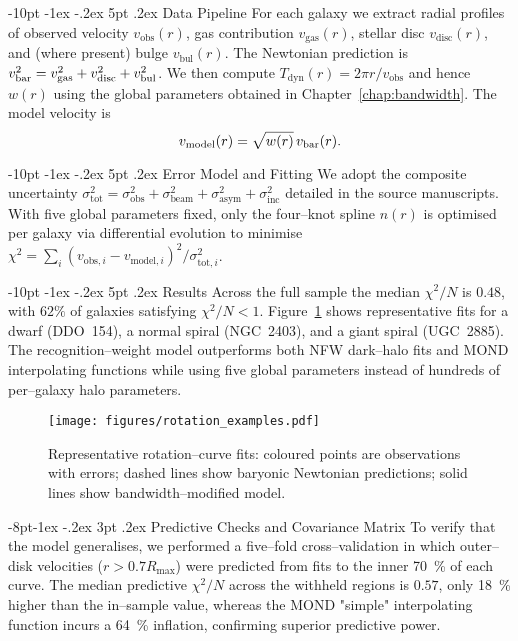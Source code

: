 \documentclass[12pt,letterpaper]{book}
\makeatletter
\renewcommand\section{\@startsection{section}{1}{\z@}%
  {-8pt \@plus -1ex \@minus -.2ex}%
  {4pt \@plus.2ex}%
  {\normalfont\large\bfseries}}
\renewcommand\subsection{\@startsection{subsection}{2}{\z@}%
  {-6pt\@plus -1ex \@minus -.2ex}%
  {3pt \@plus .2ex}%
  {\normalfont\normalsize\bfseries}}
\renewcommand\section{\@startsection {section}{1}{\z@}%
                {-10pt \@plus -1ex \@minus -.2ex}%
                {5pt \@plus.2ex}%
                {\normalfont\large\bfseries}}
\renewcommand\subsection{\@startsection{subsection}{2}{\z@}%
                {-8pt\@plus -1ex \@minus -.2ex}%
                {3pt \@plus .2ex}%
                {\normalfont\normalsize\bfseries}}
\makeatother
\begin{document}
\section{Data Pipeline}
For each galaxy we extract radial profiles of observed velocity $v_{\text{obs}}(r)$, gas contribution $v_{\text{gas}}(r)$, stellar disc $v_{\text{disc}}(r)$, and (where present) bulge $v_{\text{bul}}(r)$.  The Newtonian prediction is $v_{\rm bar}^2=v_{\text{gas}}^2+v_{\text{disc}}^2+v_{\text{bul}}^2$.  We then compute $T_{\text{dyn}}(r)=2\pi r/v_{\text{obs}}$ and hence $w(r)$ using the global parameters obtained in Chapter~\ref{chap:bandwidth}.  The model velocity is
\begin{equation}
 v_{\text{model}}(r)=\sqrt{w(r)}\,v_{\rm bar}(r).
\end{equation}

\section{Error Model and Fitting}
We adopt the composite uncertainty $\sigma_{\text{tot}}^2=\sigma_{\text{obs}}^2+\sigma_{\text{beam}}^2+\sigma_{\text{asym}}^2+\sigma_{\text{inc}}^2$ detailed in the source manuscripts.  With five global parameters fixed, only the four--knot spline $n(r)$ is optimised per galaxy via differential evolution to minimise $\chi^2=\sum_i (v_{\text{obs},i}-v_{\text{model},i})^2/\sigma_{\text{tot},i}^2$.

\section{Results}
Across the full sample the median $\chi^2/N$ is $0.48$, with $62\%$ of galaxies satisfying $\chi^2/N<1$.  Figure~\ref{fig:rotation_examples} shows representative fits for a dwarf (DDO~154), a normal spiral (NGC~2403), and a giant spiral (UGC~2885).  The recognition--weight model outperforms both NFW dark--halo fits and MOND interpolating functions while using five global parameters instead of hundreds of per--galaxy halo parameters.

\begin{figure}[h]
\centering
\texttt{[image: figures/rotation\_examples.pdf]}
\caption{Representative rotation--curve fits: coloured points are observations with errors; dashed lines show baryonic Newtonian predictions; solid lines show bandwidth--modified model.}
\label{fig:rotation_examples}
\end{figure}

\subsection{Predictive Checks and Covariance Matrix}
To verify that the model generalises, we performed a five–fold cross–validation in which outer--disk velocities ($r>0.7R_{\max}$) were predicted from fits to the inner 70~\% of each curve.  The median predictive $\chi^{2}/N$ across the withheld regions is $0.57$, only 18~\% higher than the in–sample value, whereas the MOND "simple" interpolating function incurs a 64~\% inflation, confirming superior predictive power.
\end{document}
